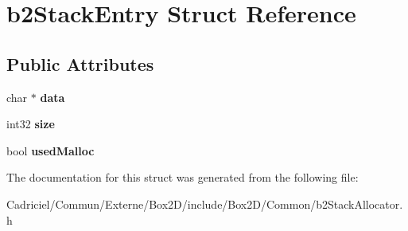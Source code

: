 \hypertarget{structb2_stack_entry}{}\section{b2\+Stack\+Entry Struct Reference}
\label{structb2_stack_entry}
\subsection*{Public Attributes}
\begin{DoxyCompactItemize}
\item 
char $\ast$ {\bfseries data}\hypertarget{structb2_stack_entry_af98aedeec2c20af0b7d3508a687ddd86}{}\label{structb2_stack_entry_af98aedeec2c20af0b7d3508a687ddd86}

\item 
int32 {\bfseries size}\hypertarget{structb2_stack_entry_a910c62f05317f8906224b2569e0cb344}{}\label{structb2_stack_entry_a910c62f05317f8906224b2569e0cb344}

\item 
bool {\bfseries used\+Malloc}\hypertarget{structb2_stack_entry_a581b5e4699bb66a28ec0727497a4e478}{}\label{structb2_stack_entry_a581b5e4699bb66a28ec0727497a4e478}

\end{DoxyCompactItemize}


The documentation for this struct was generated from the following file\+:\begin{DoxyCompactItemize}
\item 
Cadriciel/\+Commun/\+Externe/\+Box2\+D/include/\+Box2\+D/\+Common/b2\+Stack\+Allocator.\+h\end{DoxyCompactItemize}
